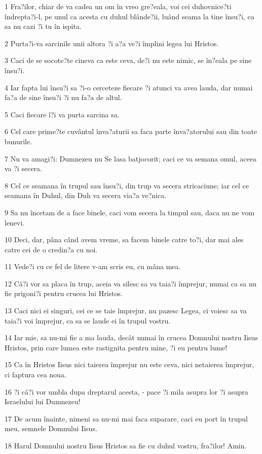 \par 1 Fra?ilor, chiar de va cadea un om în vreo gre?eala, voi cei duhovnice?ti îndrepta?i-l, pe unul ca acesta cu duhul blânde?ii, luând seama la tine însu?i, ca sa nu cazi ?i tu în ispita.
\par 2 Purta?i-va sarcinile unii altora ?i a?a ve?i împlini legea lui Hristos.
\par 3 Caci de se socote?te cineva ca este ceva, de?i nu este nimic, se în?eala pe sine însu?i.
\par 4 Iar fapta lui însu?i sa ?i-o cerceteze fiecare ?i atunci va avea lauda, dar numai fa?a de sine însu?i ?i nu fa?a de altul.
\par 5 Caci fiecare î?i va purta sarcina sa.
\par 6 Cel care prime?te cuvântul înva?aturii sa faca parte înva?atorului sau din toate bunurile.
\par 7 Nu va amagi?i: Dumnezeu nu Se lasa batjocorit; caci ce va semana omul, aceea va ?i secera.
\par 8 Cel ce seamana în trupul sau însu?i, din trup va secera stricaciune; iar cel ce seamana în Duhul, din Duh va secera via?a ve?nica.
\par 9 Sa nu încetam de a face binele, caci vom secera la timpul sau, daca nu ne vom lenevi.
\par 10 Deci, dar, pâna când avem vreme, sa facem binele catre to?i, dar mai ales catre cei de o credin?a cu noi.
\par 11 Vede?i cu ce fel de litere v-am scris eu, cu mâna mea.
\par 12 Câ?i vor sa placa în trup, aceia va silesc sa va taia?i împrejur, numai ca sa nu fie prigoni?i pentru crucea lui Hristos.
\par 13 Caci nici ei singuri, cei ce se taie împrejur, nu pazesc Legea, ci voiesc sa va taia?i voi împrejur, ca sa se laude ei în trupul vostru.
\par 14 Iar mie, sa nu-mi fie a ma lauda, decât numai în crucea Domnului nostru Iisus Hristos, prin care lumea este rastignita pentru mine, ?i eu pentru lume!
\par 15 Ca în Hristos Iisus nici taierea împrejur nu este ceva, nici netaierea împrejur, ci faptura cea noua.
\par 16 ?i câ?i vor umbla dupa dreptarul acesta, - pace ?i mila asupra lor ?i asupra Israelului lui Dumnezeu!
\par 17 De acum înainte, nimeni sa nu-mi mai faca suparare, caci eu port în trupul meu, semnele Domnului Iisus.
\par 18 Harul Domnului nostru Iisus Hristos sa fie cu duhul vostru, fra?ilor! Amin.



